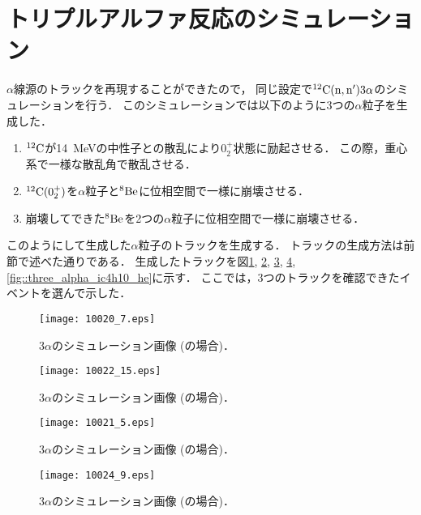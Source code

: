 \documentclass[../master]{subfiles}
\begin{document}
\section{トリプルアルファ反応のシミュレーション}
\label{sec::triple_alpha_simulation}
$\alpha$線源のトラックを再現することができたので，
同じ設定で${}^{12}{\rm C}({\rm n},{\rm n}')3\alpha$のシミュレーションを行う．
このシミュレーションでは以下のように3つの$\alpha$粒子を生成した．
\begin{enumerate}
\item
  ${}^{12}{\rm C}$が\SI{14}{\mega\electronvolt}の中性子との散乱により$0_2^+$状態に励起させる．
  この際，重心系で一様な散乱角で散乱させる．
\item
  ${}^{12}{\rm C} (0_2^+)$を$\alpha$粒子と${}^{8}{\rm Be}$に位相空間で一様に崩壊させる．
\item
  崩壊してできた${}^{8}{\rm Be}$を2つの$\alpha$粒子に位相空間で一様に崩壊させる．
\end{enumerate}
このようにして生成した$\alpha$粒子のトラックを生成する．
トラックの生成方法は前節で述べた通りである．
生成したトラックを図\ref{fig::three_alpha_ch4}, \ref{fig::three_alpha_ch4_h2}, \ref{fig::three_alpha_ch4_he},
\ref{fig::three_alpha_ic4h10_h2}, \ref{fig::three_alpha_ic4h10_he}に示す．
ここでは，3つのトラックを確認できたイベントを選んで示した．
\begin{figure}
  \centering
  \texttt{[image: 10020\_7.eps]}
  \caption{3$\alpha$のシミュレーション画像 (\Methane の場合)．}
  \label{fig::three_alpha_ch4}
\end{figure}

\begin{figure}
  \centering
  \texttt{[image: 10022\_15.eps]}
  \caption{3$\alpha$のシミュレーション画像 (\MethaneHydro の場合)．}
  \label{fig::three_alpha_ch4_h2}
\end{figure}

\begin{figure}
  \centering
  \texttt{[image: 10021\_5.eps]}
  \caption{3$\alpha$のシミュレーション画像 (\MethaneHerium の場合)．}
  \label{fig::three_alpha_ch4_he}
\end{figure}

\begin{figure}
  \centering
  \texttt{[image: 10024\_9.eps]}
  \caption{3$\alpha$のシミュレーション画像 (\isoButaneHydro の場合)．}
  \label{fig::three_alpha_ic4h10_h2}
\end{figure}
\end{document}
